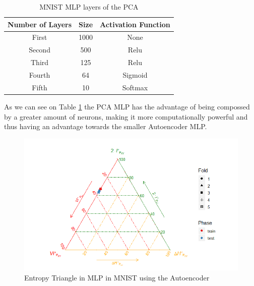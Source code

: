 \begin{table}[H]
	\caption{MNIST MLP layers of the PCA}
	\begin{center}
		\label{tab:table_MNIST_MLP_pca}
		\begin{tabular}{c|c|c} %
			\textbf{Number of Layers} & \textbf{Size} & \textbf{Activation Function} \\
			\hline
			First & 1000 & None\\
			Second & 500 & Relu\\
			Third & 125  & Relu\\
			Fourth & 64 & Sigmoid\\
			Fifth & 10 & Softmax \\
		\end{tabular}
	\end{center}
\end{table}

As we can see on Table \ref{tab:table_MNIST_MLP_pca} the PCA MLP has the advantage of being compossed by a greater amount of neurons, making it more computationally powerful and thus having an advantage towards the smaller Autoencoder MLP. 


\begin{figure}[H]
	\centering
	\includegraphics[width=1\linewidth]{Figuras_tfg/MNIST_Autoencoder_mlp}
	\caption{Entropy Triangle in MLP in MNIST using the Autoencoder}
	\label{fig:figure_MLP_MNIST_ET_Auto}
\end{figure}

